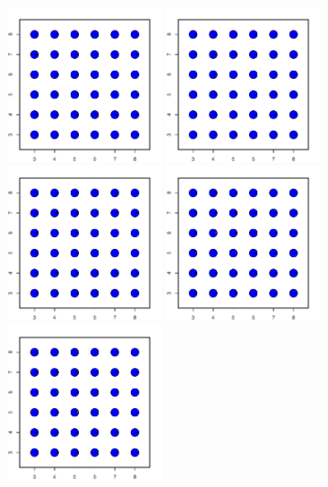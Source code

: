 \documentclass[12pt]{article}
\begin{document}
\newpage
\begin{figure}
	\centering
			{\includegraphics[width=1.8in,height=1.8in]{figs/sims/simK1_sp_pies_K2.pdf}}
			{\includegraphics[width=1.8in,height=1.8in]{figs/sims/simK1_sp_pies_K3.pdf}}
			{\includegraphics[width=1.8in,height=1.8in]{figs/sims/simK1_sp_pies_K4.pdf}}
			{\includegraphics[width=1.8in,height=1.8in]{figs/sims/simK1_sp_pies_K5.pdf}}
			{\includegraphics[width=1.8in,height=1.8in]{figs/sims/simK1_sp_pies_K6.pdf}}

\end{figure}
\end{document}
